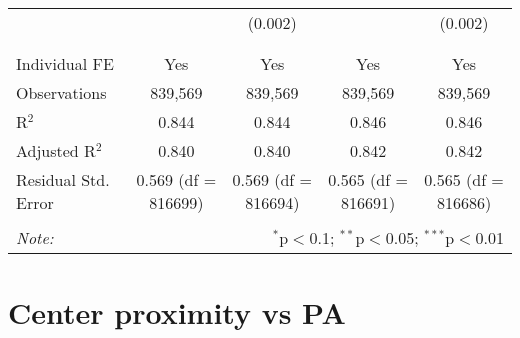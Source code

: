 \documentclass[
]{article}
\begin{document}
\begin{table}[!htbp]
{\begin{tabular}{@{\extracolsep{5pt}}lcccc}
  &  & (0.002) &  & (0.002) \\ 
  & & & & \\ 
\hline \\[-1.8ex] 
Individual FE & Yes & Yes & Yes & Yes \\ 
Observations & 839,569 & 839,569 & 839,569 & 839,569 \\ 
R$^{2}$ & 0.844 & 0.844 & 0.846 & 0.846 \\ 
Adjusted R$^{2}$ & 0.840 & 0.840 & 0.842 & 0.842 \\ 
Residual Std. Error & 0.569 (df = 816699) & 0.569 (df = 816694) & 0.565 (df = 816691) & 0.565 (df = 816686) \\ 
\hline 
\hline \\[-1.8ex] 
\textit{Note:}  & \multicolumn{4}{r}{$^{*}$p$<$0.1; $^{**}$p$<$0.05; $^{***}$p$<$0.01} \\ 
\end{tabular}
} 
\end{table} 
\newpage
\section{Center proximity vs PA}
\end{document}
